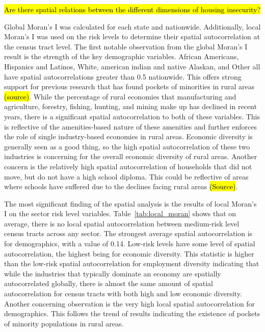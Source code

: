 \hl{Are there spatial relations between the different dimensions of housing insecurity? }

Global Moran's I was calculated for each state and nationwide. Additionally, local Moran's I was used on the risk levels to determine their spatial autocorrelation at the census tract level. The first notable observation from the global Moran's I result is the strength of the key demographic variables. African Americans, Hispanics and Latinos, White, american indian and native Alaskan, and Other all have spatial autocorrelations greater than 0.5 nationwide. This offers strong support for previous research that has found pockets of minorities in rural areas \hl{(source)}.  While the percentage of rural economies that manufacturing and agriculture, forestry, fishing, hunting, and mining make up has declined in recent years, there is a significant spatial autocorrelation to both of these variables. This is reflective of the amenities-based nature of these amenities and further enforces the role of single industry-based economies in rural areas. Economic diversity is generally seen as a good thing, so the high spatial autocorrelation of these two industries is concerning for the overall economic diversity of rural areas. Another concern is the relatively high spatial autocorrelation of households that did not move, but do not have a high school diploma. This could be reflective of areas where schools have suffered due to the declines facing rural areas \hl{(Source)}. 

The most significant finding of the spatial analysis is the results of local Moran's I on the sector risk level variables. Table~\ref{tab:local_moran} shows that on average, there is no local spatial autocorrelation between medium-risk level census tracts across any sector. The strongest average spatial autocorrelation is for demographics, with a value of 0.14. Low-risk levels have some level of spatial autocorrelation, the highest being for economic diversity. This statistic is higher than the low-risk spatial autocorrelation for employment diversity indicating that while the industries that typically dominate an economy are spatially autocorrelated globally, there is almost the same amount of spatial autocorrelation for census tracts with both high and low economic diversity. Another concerning observation is the very high local spatial autocorrelation for demographics. This follows the trend of results indicating the existence of pockets of minority populations in rural areas. 



